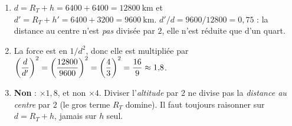 \documentclass[11pt,a4paper]{article}
\begin{document}
\begin{corrige}
\begin{enumerate}[label=\alph*)]
  \item $d=R_T+h=6400+6400=\qty{12800}{\kilo\metre}$ et
        $d'=R_T+h'=6400+3200=\qty{9600}{\kilo\metre}$.
        $d'/d=9600/12800=0{,}75$ : la distance au centre n'est \emph{pas} divisée par
        $2$, elle n'est réduite que d'un quart.
  \item La force est en $1/d^2$, donc elle est multipliée par
        $\displaystyle \left(\frac{d}{d'}\right)^2=\left(\frac{12800}{9600}\right)^2
        =\left(\frac43\right)^2=\frac{16}{9}\approx 1{,}8$.
  \item \textbf{Non} : $\times 1{,}8$, et non $\times 4$. Diviser l'\emph{altitude} par
        $2$ ne divise pas la \emph{distance au centre} par $2$ (le gros terme $R_T$
        domine). Il faut toujours raisonner sur $d=R_T+h$, jamais sur $h$ seul.
\end{enumerate}
\end{corrige}
\end{document}
